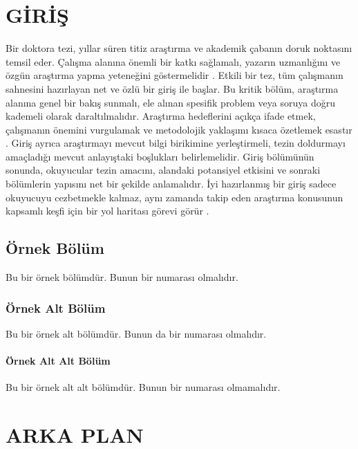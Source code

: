 \documentclass[turkish,bibstyle=apa]{kgtu}
\begin{document}

\makeatletter
\ifx\@thesislang\@trthesis

\chapter{GİRİŞ}
Bir doktora tezi, yıllar süren titiz araştırma ve akademik çabanın doruk noktasını temsil eder. Çalışma alanına önemli bir katkı sağlamalı, yazarın uzmanlığını ve özgün araştırma yapma yeteneğini göstermelidir \cite{oztoprak2023technological}. Etkili bir tez, tüm çalışmanın sahnesini hazırlayan net ve özlü bir giriş ile başlar. Bu kritik bölüm, araştırma alanına genel bir bakış sunmalı, ele alınan spesifik problem veya soruya doğru kademeli olarak daraltılmalıdır. Araştırma hedeflerini açıkça ifade etmek, çalışmanın önemini vurgulamak ve metodolojik yaklaşımı kısaca özetlemek esastır \cite{butun2021application}. Giriş ayrıca araştırmayı mevcut bilgi birikimine yerleştirmeli, tezin doldurmayı amaçladığı mevcut anlayıştaki boşlukları belirlemelidir. Giriş bölümünün sonunda, okuyucular tezin amacını, alandaki potansiyel etkisini ve sonraki bölümlerin yapısını net bir şekilde anlamalıdır. İyi hazırlanmış bir giriş sadece okuyucuyu cezbetmekle kalmaz, aynı zamanda takip eden araştırma konusunun kapsamlı keşfi için bir yol haritası görevi görür \cite{oztoprak2023holistic}.

\section{Örnek Bölüm}
Bu bir örnek bölümdür. Bunun bir numarası olmalıdır.
\lipsum[1-3]

\subsection{Örnek Alt Bölüm}
Bu bir örnek alt bölümdür. Bunun da bir numarası olmalıdır.
\lipsum[4-5]

\subsubsection{Örnek Alt Alt Bölüm}
Bu bir örnek alt alt bölümdür. Bunun bir numarası olmamalıdır.
\lipsum[6-7]

\chapter{ARKA PLAN}
\end{document}
